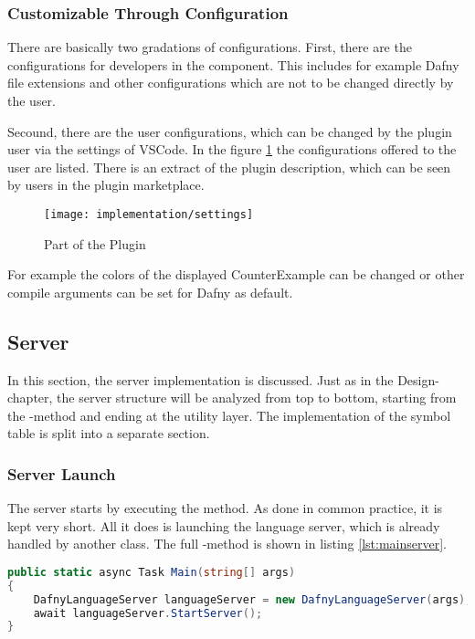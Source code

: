 \subsubsection{Customizable Through Configuration}
There are basically two gradations of configurations.
First, there are the configurations for developers in the  component.
This includes for example Dafny file extensions and other configurations which are not to be changed directly by the user.

Secound, there are the user configurations, which can be changed by the plugin user via the settings of VSCode.
In the figure \ref{fig:settings} the configurations offered to the user are listed.
There is an extract of the plugin description, which can be seen by users in the plugin marketplace.

\begin{figure}[H]
    \centering
    \texttt{[image: implementation/settings]}
    \caption{Part of the Plugin }
    \label{fig:settings}
\end{figure}

For example the colors of the displayed CounterExample can be changed or other compile arguments can be set for Dafny as default.

\subsection{Server}
In this section, the server implementation is discussed.
Just as in the Design-chapter, the server structure will be analyzed from top to bottom, starting from the -method and ending at the utility layer.
The implementation of the symbol table is split into a separate section.

\subsubsection{Server Launch}
The server starts by executing the  method.
As done in common practice, it is kept very short.
All it does is launching the language server, which is already handled by another class.
The full -method is shown in listing \ref{lst:mainserver}.

\begin{lstlisting}[language=csharp, caption={Main Function}, captionpos=b, label={lst:mainserver}]
public static async Task Main(string[] args)
{
    DafnyLanguageServer languageServer = new DafnyLanguageServer(args);
    await languageServer.StartServer();
}
\end{lstlisting}

